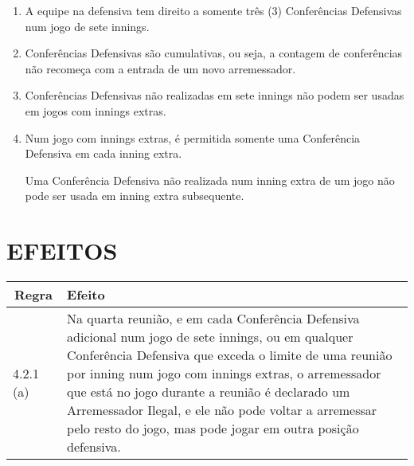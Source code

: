 	\begin{enumerate}[label=\alph*)]
		\item A equipe na defensiva tem direito a somente tr\^es (3) Confer\^encias Defensivas num jogo de sete \glspl{inning}. 
		
		\item  Confer\^encias Defensivas  s\~ao cumulativas, ou seja, a contagem de confer\^encias 
		n\~ao recome\c{c}a com a entrada de um novo arremessador. 
		
		\item  Confer\^encias Defensivas   n\~ao realizadas em sete \glspl{inning} n\~ao podem ser usadas em jogos com \glspl{inning} extras. 
		
		\item  Num jogo com \glspl{inning} extras, \'e permitida somente uma Confer\^encia Defensiva em cada \gls{inning} extra. 

		Uma Confer\^encia Defensiva  n\~ao realizada num \gls{inning} extra de um jogo n\~ao pode ser usada em \gls{inning} extra subsequente. 
		
	\end{enumerate}
\section*{EFEITOS}

{\footnotesize
	\begin{tabular}{p{}p{}|p{}}
		\multicolumn{2}{c|}{Regra} & Efeito \\\hline\hline 
		
		4.2.1 (a) & &Na quarta reuni\~ao, e em cada Confer\^encia Defensiva  adicional num jogo de sete 
		\glspl{inning}, ou em qualquer Confer\^encia Defensiva  que exceda o limite de uma 
		reuni\~ao por \gls{inning} num jogo com \glspl{inning} extras, o arremessador que est\'a no jogo 
		durante a reuni\~ao \'e declarado um Arremessador Ilegal, e ele n\~ao pode voltar a arremessar pelo resto do jogo, mas pode jogar em outra posi\c{c}\~ao defensiva. \\\hline
\end{tabular}}


